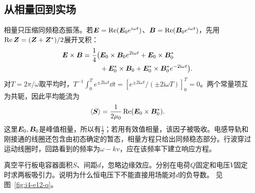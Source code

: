 \subsection{从相量回到实场}
相量只压缩同频稳态振荡。若$\bm{E}=\operatorname{Re}(\bm{E}_0e^{i\omega t})$、$\bm{B}=\operatorname{Re}(\bm{B}_0e^{i\omega t})$，先用$\operatorname{Re}\bm{Z}=(\bm{Z}+\bm{Z}^*)/2$展开叉积：
\[\begin{aligned}
\bm{E}\times\bm{B}=\frac14\big(&\bm{E}_0\times\bm{B}_0e^{2\mathrm i\omega t}
+\bm{E}_0\times\bm{B}_0^*\\
&+\bm{E}_0^*\times\bm{B}_0
+\bm{E}_0^*\times\bm{B}_0^*e^{-2\mathrm i\omega t}\big).
\end{aligned}\]
对$T=2\pi/\omega$取平均时，$T^{-1}\int_0^T e^{\pm2\mathrm i\omega t}\dd t
=[e^{\pm2\mathrm i\omega t}/(\pm2\mathrm i\omega T)]_0^T=0$。两个常量项互为共轭，因此平均能流为
\[
\langle\bm{S}\rangle=\frac1{2\mu_0}
\operatorname{Re}(\bm{E}_0\times\bm{B}_0^*).
\]
这里$\bm{E}_0,\bm{B}_0$是峰值相量，所以有$\tfrac12$；若用有效值相量，该因子被吸收。电感导轨和刚接通的线圈还包含由初态确定的暂态，相量方程只给出同频稳态部分。行波穿过运动线圈时，回路看到的频率为$\omega-kv$，应在该频率下建立响应方程。


\begin{example}[电场应力与平行板吸引力]\label{ex:i4-e12}

真空平行板电容器面积$S$、间距$d$，忽略边缘效应。分别在电荷$Q$固定和电压$V$固定时求两板吸引力。说明为什么恒电压下不能直接用场能对$d$的负导数。
 见图~\ref{fig:i4-e12-q}。
\end{example}

